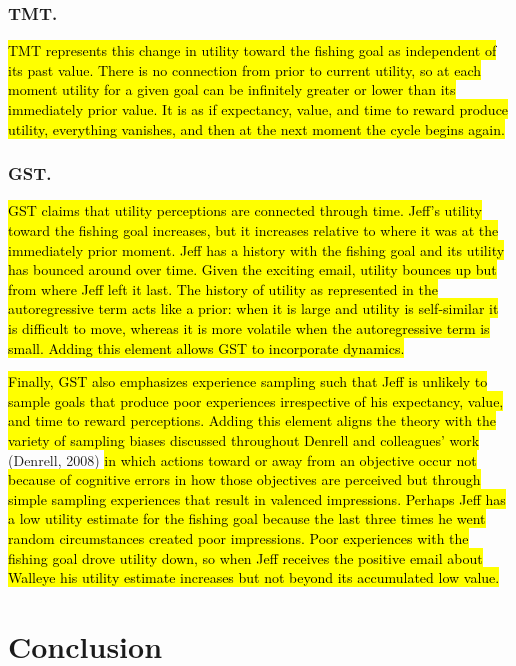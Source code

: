 \documentclass[english,,man]{apa6}
\theoremstyle{definition}
\theoremstyle{definition}
\theoremstyle{definition}
\theoremstyle{remark}
\begin{document}
\hypertarget{tmt.-1}{%
\subsubsection{TMT.}\label{tmt.-1}}

\hl{TMT represents this change in utility toward the fishing goal as independent of its past value. There is no connection from prior to current utility, so at each moment utility for a given goal can be infinitely greater or lower than its immediately prior value. It is as if expectancy, value, and time to reward produce utility, everything vanishes, and then at the next moment the cycle begins again.}

\hypertarget{gst.-1}{%
\subsubsection{GST.}\label{gst.-1}}

\hl{GST claims that utility perceptions are connected through time. Jeff's utility toward the fishing goal increases, but it increases relative to where it was at the immediately prior moment. Jeff has a history with the fishing goal and its utility has bounced around over time. Given the exciting email, utility bounces up but from where Jeff left it last. The history of utility as represented in the autoregressive term acts like a prior: when it is large and utility is self-similar it is difficult to move, whereas it is more volatile when the autoregressive term is small. Adding this element allows GST to incorporate dynamics.}

\hl{Finally, GST also emphasizes experience sampling such that Jeff is unlikely to sample goals that produce poor experiences irrespective of his expectancy, value, and time to reward perceptions. Adding this element aligns the theory with the variety of sampling biases discussed throughout Denrell and colleagues' work }(Denrell,
2008)\hl{ in which actions toward or away from an objective occur not because of cognitive errors in how those objectives are perceived but through simple sampling experiences that result in valenced impressions. Perhaps Jeff has a low utility estimate for the fishing goal because the last three times he went random circumstances created poor impressions. Poor experiences with the fishing goal drove utility down, so when Jeff receives the positive email about Walleye his utility estimate increases but not beyond its accumulated low value. }

\hypertarget{conclusion}{%
\section{Conclusion}\label{conclusion}}
\end{document}
